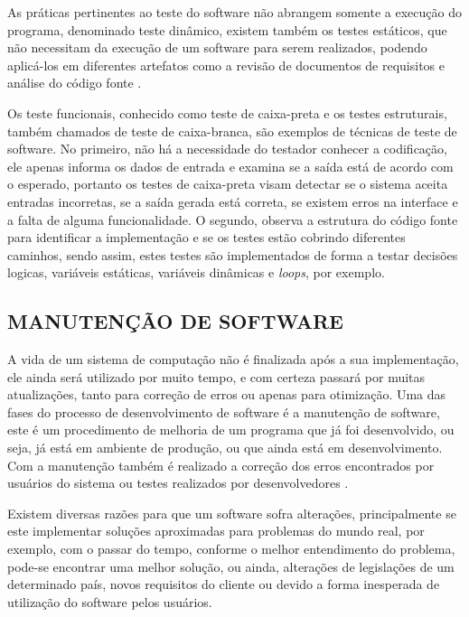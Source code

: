 As práticas pertinentes ao teste do software não abrangem somente a execução do programa, denominado teste dinâmico, existem também os testes estáticos, que não necessitam da execução de um software para serem realizados, podendo aplicá-los em diferentes artefatos como a revisão de documentos de requisitos e análise do código fonte \cite{Pedro}.

Os teste funcionais, conhecido como teste de caixa-preta e os testes estruturais, também chamados de teste de caixa-branca, são exemplos de técnicas de teste de software. No primeiro, não há a necessidade do testador conhecer a codificação, ele apenas informa os dados de entrada e examina se a saída está de acordo com o esperado, portanto os testes de caixa-preta visam detectar se o sistema aceita entradas incorretas, se a saída gerada está correta, se existem erros na interface e a falta de alguma funcionalidade. O segundo, observa a estrutura do código fonte para identificar a implementação e se os testes estão cobrindo diferentes caminhos, sendo assim, estes testes são implementados de forma a testar decisões logicas, variáveis estáticas, variáveis dinâmicas e \textit{loops}, por exemplo.\cite{Pedro}


\subsection{MANUTENÇÃO DE SOFTWARE}
\label{subsec:manutencaoDeSoftware}

A vida de um sistema de computação não é finalizada após a sua implementação, ele ainda será utilizado por muito tempo, e com certeza passará por muitas atualizações, tanto para correção de erros ou apenas para otimização. Uma das fases do processo de desenvolvimento de software é a manutenção de software, este é um procedimento de melhoria de um programa que já foi desenvolvido, ou seja, já está em ambiente de produção, ou que ainda está em desenvolvimento. Com a manutenção também é realizado a correção dos erros encontrados por usuários do sistema ou testes realizados por desenvolvedores \cite{rodrigoSpinola2011}.

Existem diversas razões para que um software sofra alterações, principalmente se este implementar soluções aproximadas para problemas do mundo real, por exemplo, com o passar do tempo, conforme o melhor entendimento do problema, pode-se encontrar uma melhor solução, ou ainda, alterações de legislações de um determinado país, novos requisitos do cliente ou devido a forma inesperada de utilização do software pelos usuários.

